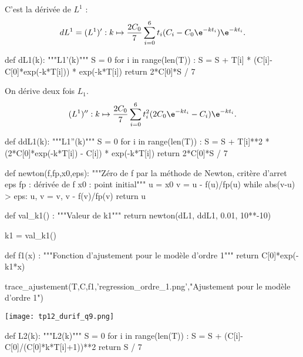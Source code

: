 \question{}
C'est la dérivée de $L^1$ : 
\begin{equation*}
  dL^1 = (L^1)' : k \mapsto \dfrac{2C_0}{7} \sum_{i=0}^6 t_i (C_i-C_0\e^{-kt_i})\e^{-kt_i}.
\end{equation*}
\begin{pyverbatim}
def dL1(k):
    """L1'(k)"""
    S = 0
    for i in range(len(T)) :
        S = S + T[i] * (C[i]-C[0]*exp(-k*T[i])) * exp(-k*T[i])
    return 2*C[0]*S / 7
\end{pyverbatim}

\question{}
On dérive deux fois $L_1$.
\begin{equation*}
  (L^1)'' : k \mapsto \dfrac{2C_0}{7}\sum_{i=0}^6 t_i^2 (2C_0\e^{-kt_i}-C_i)\e^{-kt_i}.
\end{equation*}

\begin{pyverbatim}
def ddL1(k):
    """L1''(k)"""
    S = 0
    for i in range(len(T)) :
        S = S + T[i]**2 * (2*C[0]*exp(-k*T[i]) - C[i]) * exp(-k*T[i])
    return 2*C[0]*S / 7
\end{pyverbatim}

\question{}
\begin{pyverbatim}
def newton(f,fp,x0,eps):
    """Zéro de f par la méthode de Newton, critère d'arret eps
    fp : dérivée de f
    x0 : point initial"""
    u = x0
    v = u - f(u)/fp(u)
    while abs(v-u) > eps:
        u, v = v, v - f(v)/fp(v)
    return u
\end{pyverbatim}

\question{}
\begin{pyverbatim}
def val_k1() :
    """Valeur de k1"""
    return newton(dL1, ddL1, 0.01, 10**-10)

k1 = val_k1()
  
\end{pyverbatim}

\question{}
\begin{pyverbatim}
def f1(x) :
    """Fonction d'ajustement pour le modèle d'ordre 1"""
    return  C[0]*exp(-k1*x)

trace_ajustement(T,C,f1,'regression_ordre_1.png',"Ajustement pour le modèle d'ordre 1")
\end{pyverbatim}

\begin{center}
\texttt{[image: tp12\_durif\_q9.png]}
\end{center}

\question{}
\begin{pyverbatim}
def L2(k):
    """L2(k)"""
    S = 0
    for i in range(len(T)) :
        S = S + (C[i]-C[0]/(C[0]*k*T[i]+1))**2
    return S / 7   
\end{pyverbatim}

